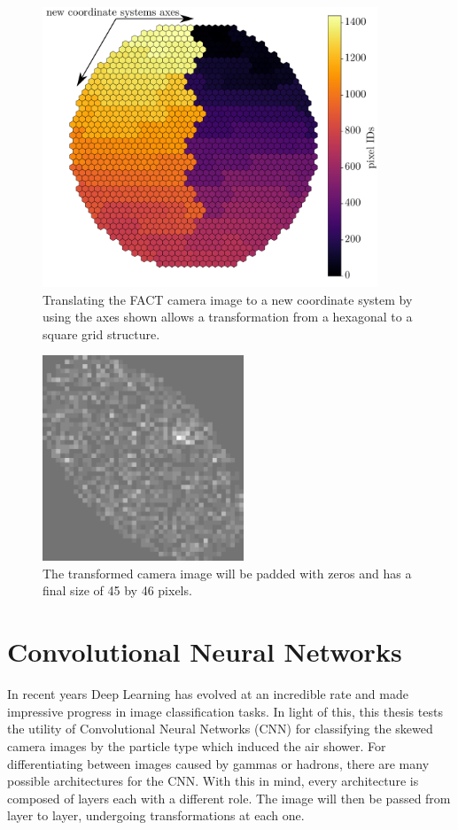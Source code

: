 \begin{figure}
    \centering
    \includegraphics[width=100mm]{Plots/FACT_Image.pdf}
    \caption{Translating the FACT camera image to a new coordinate system by using the axes shown allows a transformation from a hexagonal to a square grid structure.}
    \label{fig:fact_image}
\end{figure}

\begin{figure}
    \centering
    \includegraphics[width=60mm]{Plots/Preprocessed_Image.png}
    \caption{The transformed camera image will be padded with zeros and has a final size of \num{45} by \num{46} pixels.}
    \label{fig:preprocessed_image}
\end{figure}



\section{Convolutional Neural Networks}
In recent years Deep Learning has evolved at an incredible rate and made impressive progress in image classification tasks.
In light of this, this thesis tests the utility of Convolutional Neural Networks (CNN) for classifying the skewed camera images
by the particle type which induced the air shower.
For differentiating between images caused by gammas or hadrons, there are many possible architectures for the CNN.
With this in mind, every architecture is composed of layers each with a different role.
The image will then be passed from layer to layer, undergoing transformations at each one.

